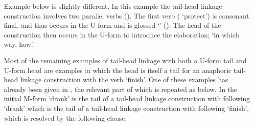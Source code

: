 Example  below is slightly different.
In this example the tail-head linkage construction involves
two parallel verbs ().
The first verb ( `protect') is consonant final,
and thus occurs in the U-form and is glossed `{\Uc}' ().
The head of the construction then occurs in the U-form
to introduce the elaboration;  `in which way, how'.

\begin{exe}
	\label{ex:130928-1, 0.43-0.55}
	\begin{xlist}
	\end{xlist}
\end{exe}

Most of the remaining examples of tail-head linkage
with both a U-form tail and U-form head are examples
in which the head is itself a tail for an anaphoric tail-head linkage
construction with the verb  `finish'.
One of these examples has already been given in ,
the relevant part of which is repeated as  below.
In  the initial M-form  `drank'
is the tail of a tail-head linkage construction with following \mbox{} `drank'
which is the tail of a tail-head linkage construction with following  `finish',
which is resolved by the following clause. %



